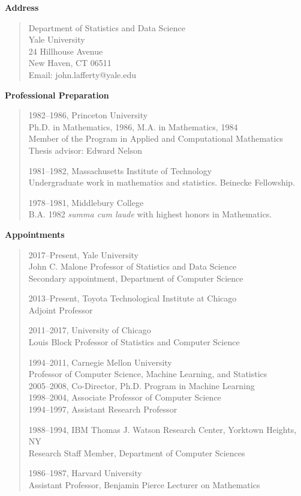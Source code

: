 \documentclass[pdftex,12pt]{article}
\begin{document}
\parindent=0pt
\pagestyle{empty}
\vskip-5pt
\def\surl#1{{\small\sl\url{#1}}}
\vskip2pt{\bf Address}

\begin{quote}
Department of Statistics and Data Science\\
Yale University\\
24 Hillhouse Avenue\\
New Haven, CT 06511\\
Email: {john.lafferty@yale.edu}
\end{quote}


\vskip1pt{\bf Professional Preparation}

\begin{quote}


1982--1986, Princeton University\\
Ph.D. in Mathematics, 1986,  M.A. in Mathematics, 1984\\
Member of the Program in Applied and Computational Mathematics\\
Thesis advisor: Edward Nelson
\vskip3pt

1981--1982, Massachusetts Institute of Technology\\
Undergraduate work in mathematics and statistics.  Beinecke Fellowship.
\vskip3pt

1978--1981, Middlebury College \\
B.A. 1982 {\em summa cum laude\/} with highest
honors in Mathematics.
\vskip5pt

\end{quote}


\vskip1pt{\bf Appointments}

\begin{quote}
2017--Present, Yale University \\
John C. Malone Professor of Statistics and Data Science\\
Secondary appointment, Department of Computer Science
\vskip5pt

2013--Present, Toyota Technological Institute at Chicago \\
Adjoint Professor
\vskip5pt

2011--2017, University of Chicago \\
Louis Block Professor of Statistics and Computer Science
\vskip5pt

1994--2011,  Carnegie Mellon University\\
Professor of Computer Science, Machine Learning, and Statistics\\[1pt]
2005--2008, Co-Director, Ph.D. Program in Machine Learning\\
1998--2004, Associate Professor of Computer Science\\
1994--1997, Assistant Research Professor
\vskip5pt

1988--1994, IBM Thomas J. Watson Research Center,
Yorktown Heights, NY\\
Research Staff Member, Department of Computer Sciences
\vskip5pt

1986--1987, Harvard University\\
Assistant Professor, Benjamin Pierce Lecturer on Mathematics
\end{quote}
\end{document}
